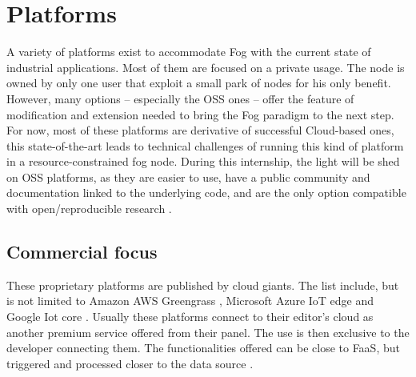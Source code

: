 \documentclass[11pt]{sdm}
\begin{document}
\section{Platforms}

A variety of platforms exist to accommodate Fog with the current state of industrial applications. Most of them are focused on a private usage. The node is owned by only one user that exploit a small park of nodes for his only benefit. However, many options -- especially the \gls{OSS} ones -- offer the feature of modification and extension needed to bring the Fog paradigm to the next step. For now, most of these platforms are derivative of successful Cloud-based ones, this state-of-the-art leads to technical challenges of running this kind of platform in a resource-constrained fog node.
During this internship, the light will be shed on \gls{OSS} platforms, as they are easier to use, have a public community and documentation linked to the underlying code, and are the only option compatible with open/reproducible research \cite{kjorveziroski_iot_2021}.


\subsection{Commercial focus}

These proprietary platforms are published by cloud giants. The list include, but is not limited to Amazon AWS Greengrass \cite{noauthor_aws_nodate}, Microsoft Azure IoT edge \cite{noauthor_iot_nodate} and Google Iot core \cite{noauthor_cloud_nodate}. Usually these platforms connect to their editor's cloud as another premium service offered from their panel. The use is then exclusive to the developer connecting them. The functionalities offered can be close to \gls{FaaS}, but triggered and processed closer to the data source \cite{elgamal_costless_2018}.
\end{document}
